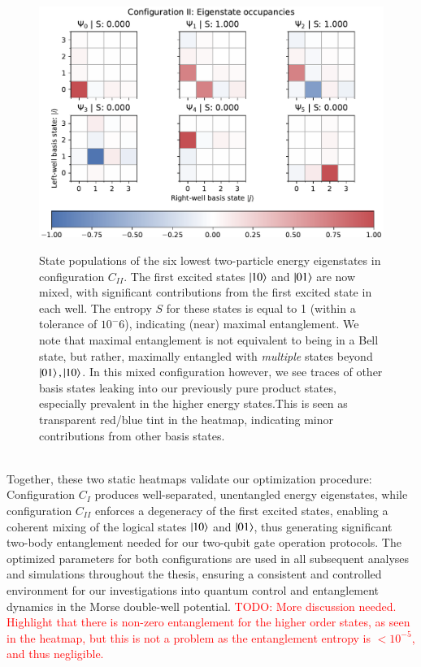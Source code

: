 \documentclass{subfiles}
\begin{document}
\begin{figure}[h!]
    \centering
    \includegraphics[width=1.0\textwidth]{figs/state_populations_II.pdf}
    \label{fig:state_populations_II}
    \caption{State populations of the six lowest two-particle energy eigenstates in configuration $C_{II}$. The first excited states $\ket{10}$ and $\ket{01}$ are now mixed, with significant contributions from the first excited state in each well. The entropy $S$ for these states is equal to 1 (within a tolerance of $10^-6$), indicating (near) maximal entanglement. We note that maximal entanglement is not equivalent to being in a Bell state, but rather, maximally entangled with \emph{multiple} states beyond $\ket{01}, \ket{10}$. In this mixed configuration however, we see traces of other basis states leaking into our previously pure product states, especially prevalent in the higher energy states.This is seen as transparent red/blue tint in the heatmap, indicating minor contributions from other basis states.}
\end{figure}
\\

Together, these two static heatmaps validate our optimization procedure: Configuration $C_I$ produces well-separated, unentangled energy eigenstates, while configuration $C_{II}$ enforces a degeneracy of the first excited states, enabling a coherent mixing of the logical states $\ket{10}$ and $\ket{01}$, thus generating significant two-body entanglement needed for our two-qubit gate operation protocols. The optimized parameters for both configurations are used in all subsequent analyses and simulations throughout the thesis, ensuring a consistent and controlled environment for our investigations into quantum control and entanglement dynamics in the Morse double-well potential. \textcolor{red}{TODO: More discussion needed. Highlight that there is non-zero entanglement for the higher order states, as seen in the heatmap, but this is not a problem as the entanglement entropy is $< 10^{-5}$, and thus negligible. }
\end{document}
